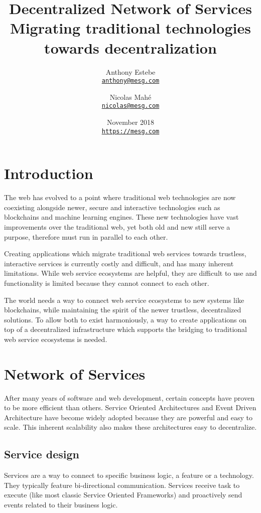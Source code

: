 \documentclass{article}
\title{Decentralized Network of Services \\ \small{Migrating traditional technologies towards decentralization}}
\author{
  Anthony Estebe\\
  \footnotesize\href{mailto:anthony@mesg.com}{\nolinkurl{anthony@mesg.com}}
  \and
  Nicolas Mahé\\
  \footnotesize\href{mailto:nicolas@mesg.com}{\nolinkurl{nicolas@mesg.com}}
}
\date{November 2018\\\small \href{https://mesg.com/}{\nolinkurl{https://mesg.com}}}
\begin{document}
\maketitle

\section{Introduction}

The web has evolved to a point where traditional web technologies are now coexisting alongside newer, secure and interactive technologies such as blockchains and machine learning engines. These new technologies have vast improvements over the traditional web, yet both old and new still serve a purpose, therefore must run in parallel to each other. 

Creating applications which migrate traditional web services towards trustless, interactive services is currently costly and difficult, and has many inherent limitations. While web service ecosystems are helpful, they are difficult to use and functionality is limited because they cannot connect to each other.

The world needs a way to connect web service ecosystems to new systems like blockchains, while maintaining the spirit of the newer trustless, decentralized solutions. To allow both to exist harmoniously, a way to create applications on top of a decentralized infrastructure which supports the bridging to traditional web service ecosystems is needed.

\section{Network of Services}

After many years of software and web development, certain concepts have proven to be more efficient than others. Service Oriented Architectures and Event Driven Architecture have become widely adopted because they are powerful and easy to scale. This inherent scalability also makes these architectures easy to decentralize.

\subsection{Service design}

Services are a way to connect to specific business logic, a feature or a technology. They typically feature bi-directional communication. Services receive task to execute (like most classic Service Oriented Frameworks) and proactively send events related to their business logic.
\end{document}

